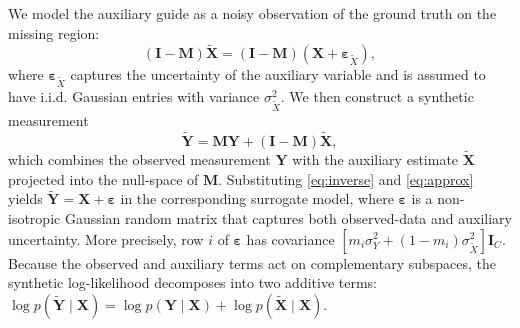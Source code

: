 \documentclass{article}
\begin{document}
We model the auxiliary guide as a noisy observation of the ground truth on the missing region:
\begin{equation} \label{eq:approx}
   (\mathbf{I} - \mathbf{M})\tilde{\mathbf{X}} = (\mathbf{I} - \mathbf{M})(\mathbf{X} + \boldsymbol{\varepsilon}_{\tilde{X}}),
\end{equation}
where $\boldsymbol{\varepsilon}_{\tilde{X}}$ captures the uncertainty of the auxiliary variable and is assumed to have i.i.d. Gaussian entries with variance $\sigma_{\tilde{X}}^2$.
We then construct a synthetic measurement
\begin{equation}
    \tilde{\mathbf{Y}} = \mathbf{M}\mathbf{Y} + (\mathbf{I} - \mathbf{M})\tilde{\mathbf{X}},
    \label{eq:synthetic_measurement}
\end{equation}
which combines the observed measurement $\mathbf{Y}$ with the auxiliary estimate $\tilde{\mathbf{X}}$ projected into the null-space of $\mathbf{M}$.
Substituting \eqref{eq:inverse} and \eqref{eq:approx} yields $\tilde{\mathbf{Y}} = \mathbf{X} + \boldsymbol{\varepsilon}$ in the corresponding surrogate model, where $\boldsymbol{\varepsilon}$ is a non-isotropic Gaussian random matrix that captures both observed-data and auxiliary uncertainty.
More precisely, row $i$ of $\boldsymbol{\varepsilon}$ has covariance $\left[m_i \sigma_Y^2 + (1-m_i)\sigma_{\tilde{X}}^2\right]\mathbf{I}_C$.
Because the observed and auxiliary terms act on complementary subspaces, the synthetic log-likelihood decomposes into two additive terms:
$\log p(\tilde{\mathbf{Y}} \mid \mathbf{X}) = \log p(\mathbf{Y} \mid \mathbf{X}) + \log p(\tilde{\mathbf{X}} \mid \mathbf{X})$.
\end{document}
